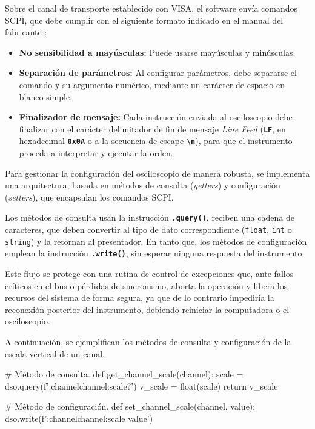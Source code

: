 Sobre el canal de transporte establecido con VISA, el software envía comandos SCPI, que debe cumplir con el siguiente formato indicado en el manual del fabricante \cite{gds1000au_ProgrammingManual}:
\begin{itemize}
    \item \textbf{No sensibilidad a mayúsculas:} Puede usarse mayúsculas y minúsculas.
    \item \textbf{Separación de parámetros:} Al configurar parámetros, debe separarse el comando y su argumento numérico, mediante un carácter de espacio en blanco simple.
    \item \textbf{Finalizador de mensaje:} Cada instrucción enviada al osciloscopio debe finalizar con el carácter delimitador de fin de mensaje \emph{Line Feed} (\textbf{\texttt{LF}}, en hexadecimal \textbf{\texttt{0x0A}} o a la secuencia de escape \textbf{\texttt{\textbackslash n}}), para que el instrumento proceda a interpretar y ejecutar la orden.
\end{itemize}

Para gestionar la configuración del osciloscopio de manera robusta, se implementa una arquitectura, basada en métodos de consulta (\emph{getters}) y configuración (\emph{setters}), que encapsulan los comandos SCPI.

Los métodos de consulta usan la instrucción \textbf{\texttt{.query()}}, reciben una cadena de caracteres, que deben convertir al tipo de dato correspondiente (\texttt{float}, \texttt{int} o \texttt{string}) y la retornan al presentador. En tanto que, los métodos de configuración emplean la instrucción \textbf{\texttt{.write()}}, sin esperar ninguna respuesta del instrumento.

Este flujo se protege con una rutina de control de excepciones que, ante fallos críticos en el bus o pérdidas de sincronismo, aborta la operación y libera los recursos del sistema de forma segura, ya que de lo contrario impediría la reconexión posterior del instrumento, debiendo reiniciar la computadora o el osciloscopio.

A continuación, se ejemplifican los métodos de consulta y configuración de la escala vertical de un canal.
\begin{python}
# Método de consulta.
def get_channel_scale(channel):
    scale = dso.query(f':channel{channel}:scale?')
    v_scale = float(scale)
    return v_scale

# Método de configuración.
def set_channel_scale(channel, value):
    dso.write(f':channel{channel}:scale {value}')
\end{python}

